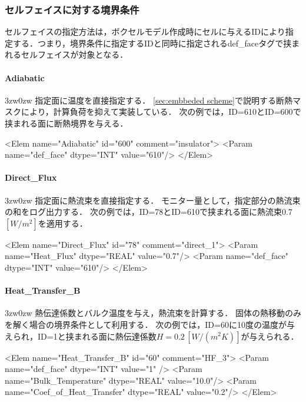 %
\subsubsection{セルフェイスに対する境界条件}
\label{sec:cellface_heat_bc}
セルフェイスの指定方法は，ボクセルモデル作成時にセルに与えるIDにより指定する．つまり，境界条件に指定するIDと同時に指定されるdef\_faceタグで挟まれるセルフェイスが対象となる．


%
\paragraph{Adiabatic}
\begin{indentation}{3zw}{0zw}
指定面に温度を直接指定する．
\ref{sec:embbeded scheme}で説明する断熱マスクにより，計算負荷を抑えて実装している．
次の例では，ID=610とID=600で挟まれる面に断熱境界を与える．
{ \small
\begin{program}
<Elem name="Adiabatic" id="600" comment="insulator">
  <Param name="def_face" dtype="INT" value="610"/>
</Elem>
\end{program}
}
\end{indentation}

%
\paragraph{Direct\_Flux}
\begin{indentation}{3zw}{0zw}
指定面に熱流束を直接指定する．
モニター量として，指定部分の熱流束の和をログ出力する．
次の例では，ID=78とID=610で挟まれる面に熱流束0.7$[W/m^2]$を適用する．
{ \small
\begin{program}
<Elem name="Direct_Flux" id="78" comment="direct_1">
  <Param name="Heat_Flux" dtype="REAL" value="0.7"/>
  <Param name="def_face" dtype="INT" value="610"/>
</Elem>
\end{program}
}
\end{indentation}

%
\paragraph{Heat\_Transfer\_B}
\begin{indentation}{3zw}{0zw}
熱伝達係数とバルク温度を与え，熱流束を計算する．
固体の熱移動のみを解く場合の境界条件として利用する．
次の例では，ID=60に10度の温度が与えられ，ID=1と挟まれる面に熱伝達係数$H=0.2\, [W/(m^{2}K)]$が与えられる．
{ \small
\begin{program}
<Elem name="Heat_Transfer_B" id="60"  comment="HF_3">
  <Param name="def_face"    dtype="INT"    value="1" />
  <Param name="Bulk_Temperature" dtype="REAL" value="10.0"/>
  <Param name="Coef_of_Heat_Transfer" dtype="REAL" value="0.2"/>
</Elem>
\end{program}
}
\end{indentation}

